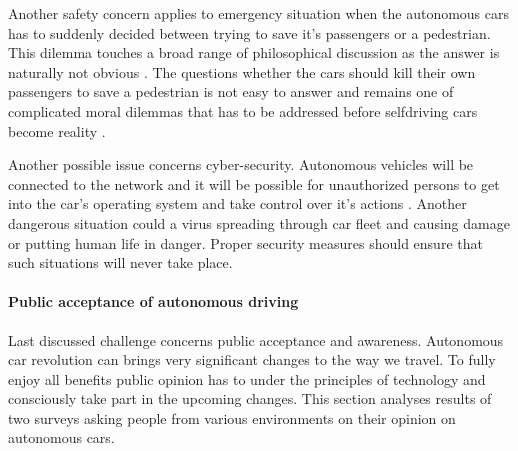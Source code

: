 \documentclass[11pt,english]{article}
\begin{document}
\par
Another safety concern applies to emergency situation when the autonomous cars has to suddenly decided between trying to save it's passengers or a pedestrian. This dilemma touches a broad range of philosophical discussion as the answer is naturally not obvious \citep{qz}. The questions whether the cars should kill their own passengers to save a pedestrian is not easy to answer and remains one of  complicated moral dilemmas that has to be addressed before selfdriving cars become reality \citep{bonnefon2015autonomous}.

\par

Another possible issue concerns cyber-security. Autonomous vehicles  will be connected to the network and it will be possible for unauthorized persons to get into the car's operating system and take control over it's actions \citep{douma2012criminal}. Another dangerous situation could a virus spreading through car fleet and causing damage or putting human life in danger. Proper security measures should ensure that such situations will never take place.
\par





\par










\paragraph{Public acceptance of autonomous driving}

\par

Last discussed challenge concerns public acceptance and awareness. Autonomous car revolution can brings very significant changes to the way we travel. To fully enjoy all benefits public opinion has to under the principles of technology and consciously take part in the upcoming changes. This section analyses results of two surveys asking people from various environments on their opinion on autonomous cars.
\end{document}
